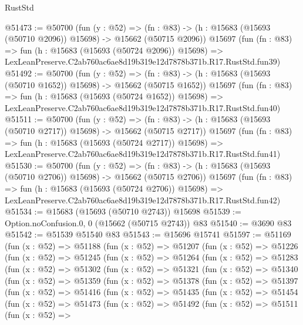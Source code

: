 \begin{lexlean}{RustStd}
\begin{coremodule}
@51473 := @50700
    (fun (y : @52) =>
    (fn : @83) -> (h : @15683 (@15693 (@50710 @2096)) @15698) -> @15662 (@50715 @2096))
    @15697
    (fun (fn : @83) =>
    fun (h : @15683 (@15693 (@50724 @2096)) @15698) =>
    LexLeanPreserve.C2ab760ac6ae8d19b319e12d7878b371b.R17.RustStd.fun39)
@51492 := @50700
    (fun (y : @52) =>
    (fn : @83) -> (h : @15683 (@15693 (@50710 @1652)) @15698) -> @15662 (@50715 @1652))
    @15697
    (fun (fn : @83) =>
    fun (h : @15683 (@15693 (@50724 @1652)) @15698) =>
    LexLeanPreserve.C2ab760ac6ae8d19b319e12d7878b371b.R17.RustStd.fun40)
@51511 := @50700
    (fun (y : @52) =>
    (fn : @83) -> (h : @15683 (@15693 (@50710 @2717)) @15698) -> @15662 (@50715 @2717))
    @15697
    (fun (fn : @83) =>
    fun (h : @15683 (@15693 (@50724 @2717)) @15698) =>
    LexLeanPreserve.C2ab760ac6ae8d19b319e12d7878b371b.R17.RustStd.fun41)
@51530 := @50700
    (fun (y : @52) =>
    (fn : @83) -> (h : @15683 (@15693 (@50710 @2706)) @15698) -> @15662 (@50715 @2706))
    @15697
    (fun (fn : @83) =>
    fun (h : @15683 (@15693 (@50724 @2706)) @15698) =>
    LexLeanPreserve.C2ab760ac6ae8d19b319e12d7878b371b.R17.RustStd.fun42)
@51534 := @15683 (@15693 (@50710 @2743)) @15698
@51539 := Option.noConfusion.{0, 0} (@15662 (@50715 @2743)) @83
@51540 := @3690 @83
@51542 := @51539 @51540 @83
@51543 := @15696 @15741
@51597 := @51169
    (fun (x : @52) =>
    @51188
      (fun (x : @52) =>
      @51207
        (fun (x : @52) =>
        @51226
          (fun (x : @52) =>
          @51245
            (fun (x : @52) =>
            @51264
              (fun (x : @52) =>
              @51283
                (fun (x : @52) =>
                @51302
                  (fun (x : @52) =>
                  @51321
                    (fun (x : @52) =>
                    @51340
                      (fun (x : @52) =>
                      @51359
                        (fun (x : @52) =>
                        @51378
                          (fun (x : @52) =>
                          @51397
                            (fun (x : @52) =>
                            @51416
                              (fun (x : @52) =>
                              @51435
                                (fun (x : @52) =>
                                @51454
                                  (fun (x : @52) =>
                                  @51473
                                    (fun (x : @52) =>
                                    @51492
                                      (fun (x : @52) =>
                                      @51511
                                        (fun (x : @52) =>

\end{coremodule}
\end{lexlean}
